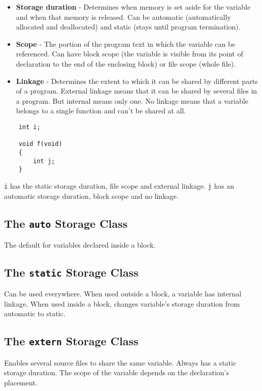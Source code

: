 \documentclass[openany]{book}
\begin{document}
    \begin{itemize}
        \item \textbf{Storage duration} - Determines when memory is set aside for the variable and when that memory is released. Can be automatic (automatically allocated and deallocated) and static (stays until program termination).
        \item \textbf{Scope} - The portion of the program text in which the variable can be referenced. Can have block scope (the variable is visible from its point of declaration to the end of the enclosing block) or file scope (whole file).
        \item \textbf{Linkage} - Determines the extent to which it can be shared by different parts of a program. External linkage means that it can be shared by several files in a program. But internal means only one. No linkage means that a variable belongs to a single function and can't be shared at all.
    \end{itemize}

    \begin{lstlisting}
    int i;

    void f(void)
    {
        int j;
    }
    \end{lstlisting}
    
    \texttt{i} has the static storage duration, file scope and external linkage. \texttt{j} has an automatic storage duration, block scope and no linkage.

    \subsection*{The \texttt{auto} Storage Class}
    The default for variables declared inside a block.

    \subsection*{The \texttt{static} Storage Class}
    Can be used everywhere. When used outside a block, a variable has internal linkage. When used inside a block, changes variable's storage duration from automatic to static.

    \subsection*{The \texttt{extern} Storage Class}
    Enables several source files to share the same variable. Always has a static storage duration. The scope of the variable depends on the declaration's placement.
\end{document}
